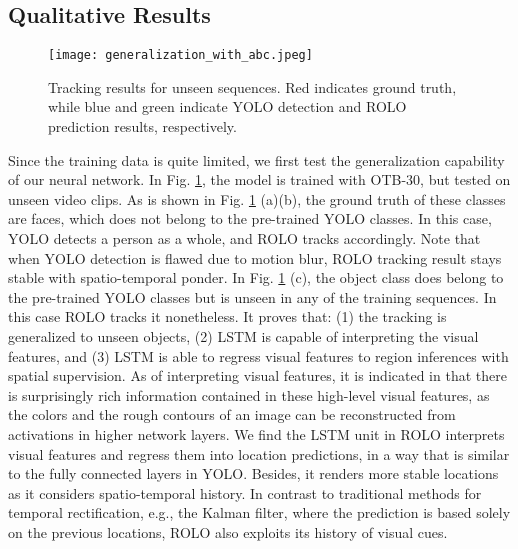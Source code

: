 \documentclass{article}
\begin{document}
\subsection{Qualitative Results}
\begin{figure}[h] %
	\tiny
	\captionsetup{justification=centering}
	\texttt{[image: generalization\_with\_abc.jpeg]}
	\caption{Tracking results for unseen sequences. Red indicates ground truth, while blue and green indicate YOLO detection and ROLO prediction results, respectively.}
	\label{fig-Generalization}
\end{figure}

Since the training data is quite limited, we first test the generalization capability of our neural network.
In Fig. \ref{fig-Generalization}, the model is trained with OTB-30, but tested on unseen video clips. As is shown in Fig. \ref{fig-Generalization} (a)(b), the ground truth of these classes are faces, which does not belong to the pre-trained YOLO classes. In this case, YOLO detects a person as a whole, and ROLO tracks accordingly. Note that when YOLO detection is flawed due to motion blur, ROLO tracking result stays stable with spatio-temporal ponder. In Fig. \ref{fig-Generalization} (c), the object class does belong to the pre-trained YOLO classes but is unseen in any of the training sequences. In this case ROLO tracks it nonetheless.
It proves that: (1) the tracking is generalized to unseen objects, (2) LSTM is capable of interpreting the visual features, and (3) LSTM is able to regress visual features to region inferences with spatial supervision.
As of interpreting visual features, it is indicated in \citep{dosovitskiy2015inverting} that there is surprisingly rich information contained in these high-level visual features, as the colors and the rough contours of an image can be reconstructed from activations in higher network layers. %
We find the LSTM unit in ROLO interprets visual features and regress them into location predictions, in a way that is similar to the fully connected layers in YOLO. Besides, it renders more stable locations as it considers spatio-temporal history. In contrast to traditional methods for temporal rectification, e.g., the Kalman filter, where the prediction is based solely on the previous locations, ROLO also exploits its history of visual cues.
\end{document}
